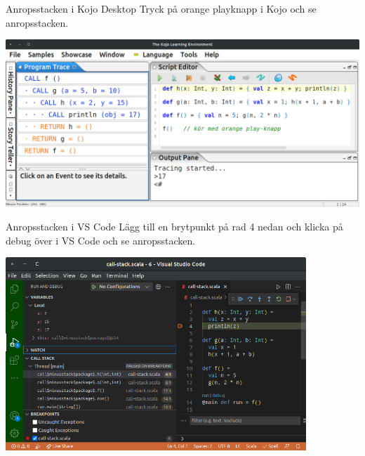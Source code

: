 \begin{Slide}{Anropsstacken i Kojo Desktop}
Tryck på orange playknapp i Kojo och se anropsstacken.\vspace{0.5em}

\includegraphics[width=1.0\textwidth]{../img/kojo-trace.png}  
\end{Slide}

\begin{Slide}{Anropsstacken i VS Code}
Lägg till en brytpunkt på rad 4 nedan och klicka på debug över  i VS Code och se anropsstacken.\vspace{0.5em}

\includegraphics[width=0.85\textwidth]{../img/vscode-trace.png}  
\end{Slide}


